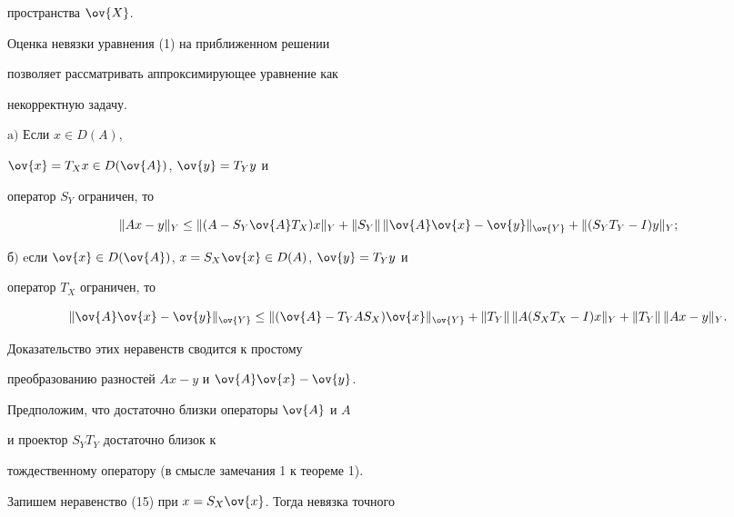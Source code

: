 пространства $\ov{X}$.





Оценка невязки уравнения (1) на приближенном решении


позволяет рассматривать аппроксимирующее уравнение как


некорректную задачу.





\begin{lem}


$\mathrm{a)}$ Если $x\in D(A)$,


$\ov{x}=T_Xx\in D(\ov{A})$, $\ov{y}=T_Yy$ и


оператор $S_Y$ ограничен, то


\begin{equation}


\nr{Ax -y}_Y \le \nr{(A-S_Y\ov{A} T_X)x}_Y


 + \nr{S_Y}\,\nr{\ov{A}\ov{x} -\ov{y}}_{\ov{Y}} +


\nr{(S_YT_Y-I)y}_Y;


\end{equation}




$б)$ eсли $\ov{x}\in D(\ov{A})$, $x=S_X\ov{x}\in D(A)$, $\ov{y}=T_Yy$ и


оператор $T_X$ ограничен, то


$$


\nr{\ov{A}\ov{x} -\ov{y}}_{\ov{Y}} \le \nr{(\ov{A}-T_YAS_X)\ov{x}}_{\ov{Y}}


+ \nr{T_Y}\,\nr{A(S_XT_X-I)x}_Y +


\nr{T_Y}\,\nr{Ax-y}_Y.


$$


\end{lem}





Доказательство этих неравенств сводится к простому


преобразованию разностей $Ax-y$ и $\ov{A}\ov{x}-\ov{y}$.





Предположим, что достаточно близки операторы $\ov{A}$ и $A$


и проектор $S_YT_Y$ достаточно близок к


тождественному оператору (в смысле замечания 1 к теореме 1).


Запишем неравенство (15) при $x=S_X\ov{x}$. Тогда невязка точного


